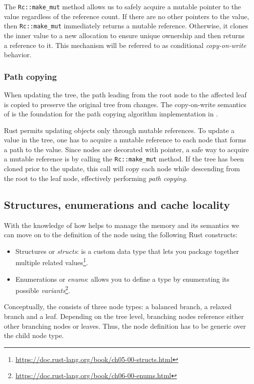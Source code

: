 The \texttt{Rc::make_mut} method allows us to safely acquire a mutable pointer to the value regardless of the reference count. If there are no other pointers to the value, then \texttt{Rc::make_mut} immediately returns a mutable reference. Otherwise, it clones the inner value to a new allocation to ensure unique ownership and then returns a reference to it. This mechanism will be referred to as conditional \emph{copy-on-write} behavior.

\subsubsection*{Path copying}
When updating the tree, the path leading from the root node to the affected leaf is copied to preserve the original tree from changes. The copy-on-write semantics of \rc{} is the foundation for the path copying algorithm implementation in \rrbtree{}.

Rust permits updating objects only through mutable references. To update a value in the tree, one has to acquire a mutable reference to each node that forms a path to the value. Since nodes are decorated with \rc{} pointer, a safe way to acquire a mutable reference is by calling the \texttt{Rc::make_mut} method. If the tree has been cloned prior to the update, this call will copy each node while descending from the root to the leaf node, effectively performing \emph{path copying}.

\subsection{Structures, enumerations and cache locality}
With the knowledge of how \rc{} helps to manage the memory and its semantics we can move on to the definition of the \rrbtree{} node using the following Rust constructs:
\begin{itemize}
    \item Structures or \emph{structs}: is a custom data type that lets you package together multiple related values\footnote{\url{https://doc.rust-lang.org/book/ch05-00-structs.html}}.
    \item Enumerations or \emph{enums}: allows you to define a type by enumerating its possible \emph{variants}\footnote{\url{https://doc.rust-lang.org/book/ch06-00-enums.html}}.
\end{itemize}

Conceptually, the \rrbtree{} consists of three node types: a balanced branch, a relaxed branch and a leaf. Depending on the tree level, branching nodes reference either other branching nodes or leaves. Thus, the node definition has to be generic over the child node type.

